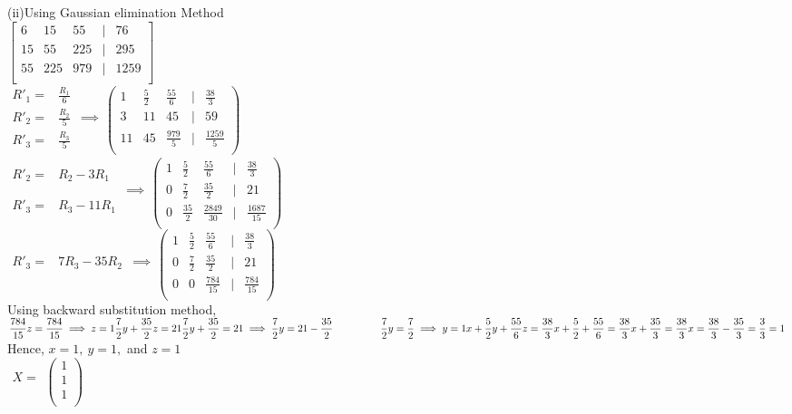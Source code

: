 \documentclass[a4paper, 12pt]{report}
\newcommand{\sps}{\\[0.2cm]}
\newcommand{\spn}[1]{\\[#1cm]}
\newcommand{\NI}{\noindent}
\newcommand{\dsp}{\displaystyle}
\newcommand{\bp}{\Big|}
\begin{document}
{\NI(ii)Using Gaussian elimination Method\sps
$\dsp
\begin{bmatrix}
6 & 15 & 55 & \bp & 76\\
15 & 55 & 225 & \bp & 295\\
55 & 225 & 979 & \bp & 1259\\
\end{bmatrix}
$\sps
$\dsp
\begin{array}{clr}
R'_1 =& \frac{R_1}{6} &\sps
R'_2 =& \frac{R_2}{5}&\implies \sps
R'_3 =& \frac{R_3}{5} & \sps
\end{array}
\left(
\begin{array}{cccccc}
1 & \frac{5}{2} & \frac{55}{6} & \bp & \frac{38}{3}\\
3 & 11 & 45 & \bp & 59\\
11 & 45 & \frac{979}{5} & \bp & \frac{1259}{5}\\
\end{array}
\right)
$\spn{0.7}
$\dsp
\begin{array}{clr}
R'_2 =& R_2 - 3R_1&\\
& & \implies \\
R'_3 =& R_3 - 11R_1 & \sps
\end{array}
\left(
\begin{array}{cccccc}
1 & \frac{5}{2} & \frac{55}{6} & \bp & \frac{38}{3}\\
0 & \frac{7}{2} & \frac{35}{2} & \bp & 21\\
0 &\frac{35}{2} &\frac{2849}{30} & \bp & \frac{1687}{15}\\
\end{array}
\right)
$\spn{0.7}
$\dsp
\begin{array}{clr}
R'_3 =& 7R_3 - 35R_2& \implies \\
\end{array}
\left(
\begin{array}{cccccc}
1 & \frac{5}{2} & \frac{55}{6} & \bp & \frac{38}{3}\\
0 & \frac{7}{2} & \frac{35}{2} & \bp & 21\\
0 &0 &\frac{784}{15} & \bp & \frac{784}{15}\\
\end{array}
\right)
$\spn{0.7}
Using backward substitution method,\\
$\dsp
\frac{784}{15}z = \frac{784}{15} \implies z = 1\sps
\frac{7}{2}y + \frac{35}{2}z = 21 \sps
\frac{7}{2}y + \frac{35}{2} = 21 \implies \frac{7}{2}y = 21 - \frac{35}{2}\sps
~~~~~~~~~~~~~~ \frac{7}{2}y = \frac{7}{2} \implies y=1\sps
x + \frac{5}{2}y + \frac{55}{6}z = \frac{38}{3}\sps
x + \frac{5}{2} + \frac{55}{6} = \frac{38}{3}\sps
x + \frac{35}{3} = \frac{38}{3}\sps
x = \frac{38}{3} - \frac{35}{3} = \frac{3}{3} = 1\sps
$\sps
Hence, $x=1,~y=1,$ and $z=1$\sps
$\dsp
\begin{array}{c}
X =
\left.\right.\\
\left.\right.\\
\end{array}
\left(
\begin{array}{c}
1\\1\\1\\
\end{array}
\right)
$\spn{0.5}

}
\end{document}
